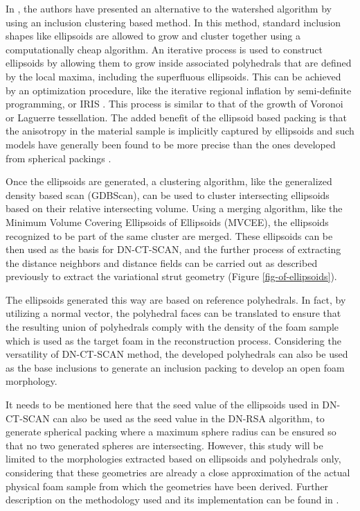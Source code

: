 In \cite{leblancAnalysisOpenFoamUnderPreparation}, the authors have presented an alternative to the watershed algorithm by using an inclusion clustering based method. In this method, standard inclusion shapes like ellipsoids are allowed to grow and cluster together using a computationally cheap algorithm. An iterative process is used to construct ellipsoids by allowing them to grow inside associated polyhedrals that are defined by the local maxima, including the superfluous ellipsoids. This can be achieved by an optimization procedure, like the iterative regional inflation by semi-definite programming, or IRIS \cite{deitsComputingLargeConvex2015}. This process is similar to that of the growth of Voronoi or Laguerre tessellation. The added benefit of the ellipsoid based packing is that the anisotropy in the material sample is implicitly captured by ellipsoids and such models have generally been found to be more precise than the ones developed from spherical packings \cite{teferraTessellationGrowthModels2015,sedivy3DReconstructionGrains2016}.

Once the ellipsoids are generated, a clustering algorithm, like the generalized density based scan (GDBScan)\cite{sanderDensityBasedClusteringSpatial1998}, can be used to cluster intersecting ellipsoids based on their relative intersecting volume. Using a merging algorithm, like the Minimum Volume Covering Ellipsoids of Ellipsoids (MVCEE)\cite{yildirimMinimumVolumeCovering2006}, the ellipsoids recognized to be part of the same cluster are merged. These ellipsoids can be then used as the basis for DN-CT-SCAN, and the further process of extracting the distance neighbors and distance fields can be carried out as described previously to extract the variational strut geometry (Figure \ref{fig-of-ellipsoids}).

The ellipsoids generated this way are based on reference polyhedrals. In fact, by utilizing a normal vector, the polyhedral faces can be translated to ensure that the resulting union of polyhedrals comply with the density of the foam sample which is used as the target foam in the reconstruction process\cite{leblancAnalysisOpenFoamUnderPreparation}. Considering the versatility of DN-CT-SCAN method, the developed polyhedrals can also be used as the base inclusions to generate an inclusion packing to develop an open foam morphology.

It needs to be mentioned here that the seed value of the ellipsoids used in DN-CT-SCAN can also be used as the seed value in the DN-RSA algorithm, to generate spherical packing where a maximum sphere radius can be ensured so that no two generated spheres are intersecting. However, this study will be limited to the morphologies extracted based on ellipsoids and polyhedrals only, considering that these geometries are already a close approximation of the actual physical foam sample from which the geometries have been derived. Further description on the methodology used and its implementation can be found in \cite{leblancAnalysisOpenFoamUnderPreparation}.

